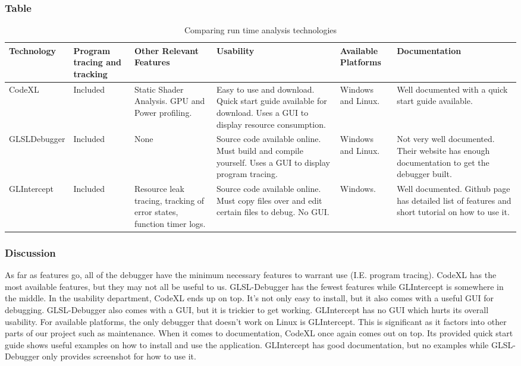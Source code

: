 \documentclass[10pt,journal,compsoc,draftclsnofoot]{IEEEtran}
\begin{document}
\subsubsection{Table}
\begin{center}
\begin{table}[H]
\begin{tabular}{ | m{7em} | m{7em} | m{7em} | m{7em} | m{7em} | m{7em} |  } 
\hline
\textbf{Technology}  & \textbf{Program tracing and tracking} & \textbf{Other Relevant Features} & \textbf{Usability} & \textbf{Available Platforms} & \textbf{Documentation} \\ \hline
CodeXL & Included  & Static Shader Analysis. GPU and Power profiling. & Easy to use and download. Quick start guide available for download.
Uses a GUI to display resource consumption. & Windows and Linux. & Well documented with a quick start guide available.  \\ \hline
GLSL\-Debugger & Included & None & Source code available online. Must build and compile yourself. Uses a GUI to display program tracing. & Windows and Linux. & Not very well documented. Their website has enough documentation to get the debugger built.  \\ \hline
GLIntercept & Included & Resource leak tracing, tracking of error states, function timer logs. & Source code available online. Must copy files over and edit certain files to debug. No GUI. & Windows. & Well documented. Github page has detailed list of features and short tutorial on how to use it. \\ \hline
\end{tabular}
\newline
\caption{Comparing run time analysis technologies}
\label{table:runtime}
\end{table}
\end{center}

\newpage

\subsubsection{Discussion}
As far as features go, all of the debugger have the minimum necessary features to warrant use (I.E. program tracing).
CodeXL has the most available features, but they may not all be useful to us.
GLSL-Debugger has the fewest features while GLIntercept is somewhere in the middle.
In the usability department, CodeXL ends up on top.
It's not only easy to install, but it also comes with a useful GUI for debugging.
GLSL-Debugger also comes with a GUI, but it is trickier to get working.
GLIntercept has no GUI which hurts its overall usability.
For available platforms, the only debugger that doesn't work on Linux is GLIntercept.
This is significant as it factors into other parts of our project such as maintenance.
When it comes to documentation, CodeXL once again comes out on top.
Its provided quick start guide shows useful examples on how to install and use the application.
GLIntercept has good documentation, but no examples while GLSL-Debugger only provides screenshot for how to use it.
\end{document}
